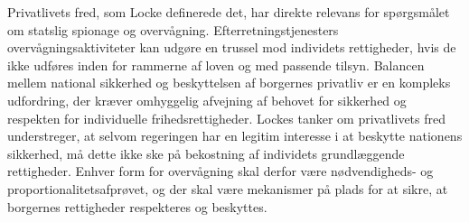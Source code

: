 Privatlivets fred, som Locke definerede det, har direkte relevans for spørgsmålet om statslig spionage og overvågning. Efterretningstjenesters overvågningsaktiviteter kan udgøre en trussel mod individets rettigheder, hvis de ikke udføres inden for rammerne af loven og med passende tilsyn. Balancen mellem national sikkerhed og beskyttelsen af borgernes privatliv er en kompleks udfordring, der kræver omhyggelig afvejning af behovet for sikkerhed og respekten for individuelle frihedsrettigheder. Lockes tanker om privatlivets fred understreger, at selvom regeringen har en legitim interesse i at beskytte nationens sikkerhed, må dette ikke ske på bekostning af individets grundlæggende rettigheder. Enhver form for overvågning skal derfor være nødvendigheds- og proportionalitetsafprøvet, og der skal være mekanismer på plads for at sikre, at borgernes rettigheder respekteres og beskyttes.

\newpage
